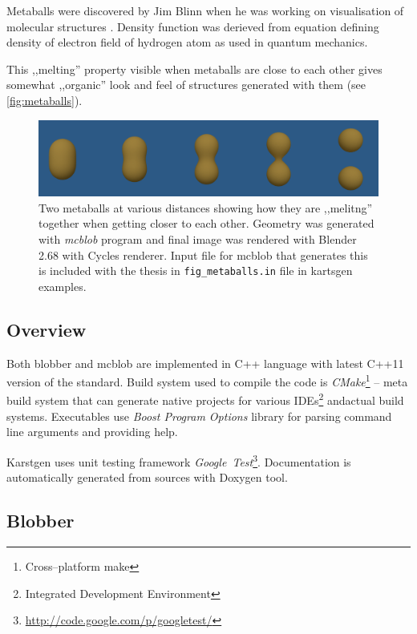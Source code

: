 Metaballs were discovered by Jim Blinn when he was working on visualisation of
molecular structures \parencite{Blinn:1982:GAS:357306.357310}. Density function 
was derieved from equation defining density of electron field of hydrogen atom
as used in quantum mechanics.

This ,,melting'' property visible when metaballs are close to each other gives
somewhat ,,organic'' look and feel of structures generated with them
(see \autoref{fig:metaballs}).
\label{sub:metaballs}
\begin{figure}[htb]
  \begin{center}
    \includegraphics[width=\textwidth]{chapters/project/metaballs.png}
  \end{center}
  \caption{Two metaballs at various distances showing how they are ,,melitng''
    together when getting closer to each other. Geometry was generated with
    \emph{mcblob} program and final image was rendered with Blender 2.68 with
    Cycles renderer. Input file for mcblob that generates this is included with the thesis
      in \texttt{fig\_metaballs.in} file in kartsgen examples.
  }
  \label{fig:metaballs}
\end{figure}


\subsection{Overview}
Both blobber and mcblob are implemented in C++ language with latest C++11
version of the standard. Build system used to compile the code is \emph{CMake}\footnote{Cross--platform make}
-- meta build system that can generate native projects for various IDEs\footnote{Integrated Development Environment}
andactual build systems. Executables use \emph{Boost Program Options} library
for parsing command line arguments and providing help.

Karstgen uses unit testing framework \emph{Google~Test}\footnote{\url{http://code.google.com/p/googletest/}}.
Documentation is automatically generated from sources with Doxygen
tool.


\subsection{Blobber}


